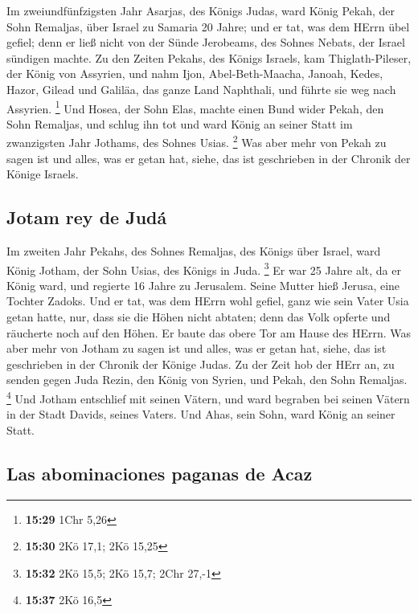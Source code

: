  Im zweiundfünfzigsten Jahr Asarjas, des Königs Judas,
ward König Pekah, der Sohn Remaljas, über Israel zu Samaria 20 Jahre;
 und er tat, was dem HErrn übel gefiel; denn er ließ
nicht von der Sünde Jerobeams, des Sohnes Nebats, der Israel sündigen
machte.  Zu den Zeiten Pekahs, des Königs Israels, kam
Thiglath-Pileser, der König von Assyrien, und nahm Ijon,
Abel-Beth-Maacha, Janoah, Kedes, Hazor, Gilead und Galiläa, das ganze
Land Naphthali, und führte sie weg nach Assyrien. \footnote{\textbf{15:29}
  1Chr 5,26}  Und Hosea, der Sohn Elas, machte einen Bund
wider Pekah, den Sohn Remaljas, und schlug ihn tot und ward König an
seiner Statt im zwanzigsten Jahr Jothams, des Sohnes Usias. \footnote{\textbf{15:30}
  2Kö 17,1; 2Kö 15,25}  Was aber mehr von Pekah zu sagen
ist und alles, was er getan hat, siehe, das ist geschrieben in der
Chronik der Könige Israels.

\hypertarget{jotam-rey-de-juduxe1}{%
\subsection{Jotam rey de Judá}\label{jotam-rey-de-juduxe1}}

 Im zweiten Jahr Pekahs, des Sohnes Remaljas, des Königs
über Israel, ward König Jotham, der Sohn Usias, des Königs in Juda.
\footnote{\textbf{15:32} 2Kö 15,5; 2Kö 15,7; 2Chr 27,-1} 
Er war 25 Jahre alt, da er König ward, und regierte 16 Jahre zu
Jerusalem. Seine Mutter hieß Jerusa, eine Tochter Zadoks.
 Und er tat, was dem HErrn wohl gefiel, ganz wie sein
Vater Usia getan hatte,  nur, dass sie die Höhen nicht
abtaten; denn das Volk opferte und räucherte noch auf den Höhen. Er
baute das obere Tor am Hause des HErrn.  Was aber mehr
von Jotham zu sagen ist und alles, was er getan hat, siehe, das ist
geschrieben in der Chronik der Könige Judas.  Zu der Zeit
hob der HErr an, zu senden gegen Juda Rezin, den König von Syrien, und
Pekah, den Sohn Remaljas. \footnote{\textbf{15:37} 2Kö 16,5}
 Und Jotham entschlief mit seinen Vätern, und ward
begraben bei seinen Vätern in der Stadt Davids, seines Vaters.
 Und Ahas, sein Sohn, ward König an seiner Statt.

\hypertarget{las-abominaciones-paganas-de-acaz}{%
\subsection{Las abominaciones paganas de
Acaz}\label{las-abominaciones-paganas-de-acaz}}


